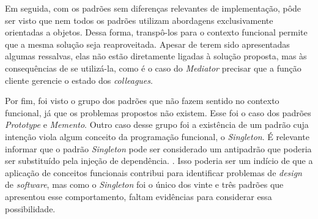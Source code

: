 Em seguida, com os padrões sem diferenças 
relevantes de implementação, pôde ser visto 
que nem todos os padrões utilizam abordagens 
exclusivamente orientadas a objetos. Dessa forma, 
transpô-los para o contexto funcional 
permite que a mesma solução seja reaproveitada. 
Apesar de terem sido apresentadas algumas 
ressalvas, elas não estão diretamente ligadas 
à solução proposta, mas às consequências de 
se utilizá-la, como é o caso do \textit{Mediator} 
precisar que a função cliente gerencie o 
estado dos \textit{colleagues}. 

Por fim, foi visto o grupo dos padrões 
que não fazem sentido no contexto funcional, 
já que os problemas propostos não existem. 
Esse foi o caso dos padrões \textit{Prototype} e \textit{Memento}.
Outro caso desse grupo foi a existência de 
um padrão cuja intenção viola algum conceito da 
programação funcional, o \textit{Singleton}. 
É relevante informar que o padrão \textit{Singleton} 
pode ser considerado um antipadrão que poderia 
ser substituído pela injeção de dependência.
\cite{singletonantipattern}. Isso poderia 
ser um indício de que a aplicação de 
conceitos funcionais contribui para 
identificar problemas de \textit{design} de 
\textit{software}, mas como o \textit{Singleton} 
foi o único dos vinte e três padrões que 
apresentou esse comportamento, faltam 
evidências para considerar essa 
possibilidade.



